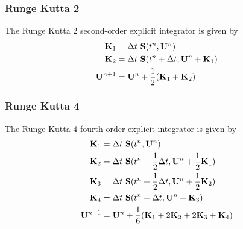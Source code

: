 \subsubsection*{Runge Kutta 2}


The Runge Kutta 2 second-order explicit integrator is given by
\begin{align*}
	\mathbf{K}_1 &= \Delta t \ \mathbf{S}(t^n, \mathbf{U}^n)\\
	\mathbf{K}_2 &= \Delta t \ \mathbf{S}(t^n + \Delta t, \mathbf{U}^n + \mathbf{K}_1)\\
	\mathbf{U}^{n+1} &= \mathbf{U}^n + \frac{1}{2} (\mathbf{K}_1 + \mathbf{K}_2)
\end{align*}




\subsubsection*{Runge Kutta 4}


The Runge Kutta 4 fourth-order explicit integrator is given by
\begin{align*}
	\mathbf{K}_1 &= \Delta t \ \mathbf{S}(t^n, \mathbf{U}^n)\\
	\mathbf{K}_2 &= \Delta t \ \mathbf{S}(t^n + \frac{1}{2}\Delta t, \mathbf{U}^n + \frac{1}{2}\mathbf{K}_1)\\
	\mathbf{K}_3 &= \Delta t \ \mathbf{S}(t^n + \frac{1}{2}\Delta t, \mathbf{U}^n + \frac{1}{2}\mathbf{K}_2)\\
	\mathbf{K}_4 &= \Delta t \ \mathbf{S}(t^n + \Delta t, \mathbf{U}^n + \mathbf{K}_3)\\
	\mathbf{U}^{n+1} &= \mathbf{U}^n + \frac{1}{6} (\mathbf{K}_1 + 2\mathbf{K}_2 + 2\mathbf{K}_3 + \mathbf{K}_4)
\end{align*}



